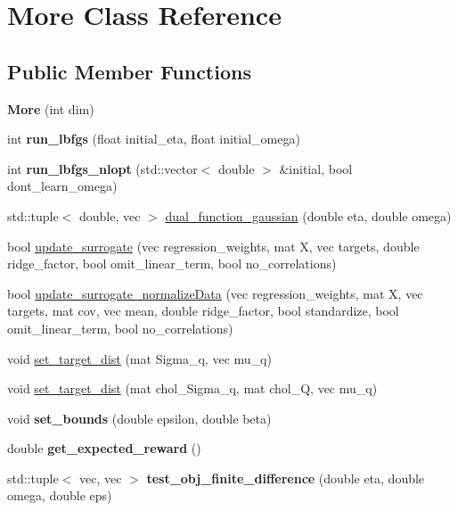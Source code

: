 \hypertarget{classMore}{}\section{More Class Reference}
\label{classMore}
\subsection*{Public Member Functions}
\begin{DoxyCompactItemize}
\item 
{\bfseries More} (int dim)\hypertarget{classMore_a4d5e29a878e515129484d2a04738ed4f}{}\label{classMore_a4d5e29a878e515129484d2a04738ed4f}

\item 
int {\bfseries run\+\_\+lbfgs} (float initial\+\_\+eta, float initial\+\_\+omega)\hypertarget{classMore_a1deae43fa72d7ce2ef34dd10cc44a75f}{}\label{classMore_a1deae43fa72d7ce2ef34dd10cc44a75f}

\item 
int {\bfseries run\+\_\+lbfgs\+\_\+nlopt} (std\+::vector$<$ double $>$ \&initial, bool dont\+\_\+learn\+\_\+omega)\hypertarget{classMore_aafcaa1a9dd299715349391a9092691ad}{}\label{classMore_aafcaa1a9dd299715349391a9092691ad}

\item 
std\+::tuple$<$ double, vec $>$ \hyperlink{classMore_aa3fdb202ca291e253f7c157d8a13040b}{dual\+\_\+function\+\_\+gaussian} (double eta, double omega)
\item 
bool \hyperlink{classMore_a5bb1da06e25a581a06d4c84359702e7b}{update\+\_\+surrogate} (vec regression\+\_\+weights, mat X, vec targets, double ridge\+\_\+factor, bool omit\+\_\+linear\+\_\+term, bool no\+\_\+correlations)
\item 
bool \hyperlink{classMore_a0943909cf34c607dba952bf65f724702}{update\+\_\+surrogate\+\_\+normalize\+Data} (vec regression\+\_\+weights, mat X, vec targets, mat cov, vec mean, double ridge\+\_\+factor, bool standardize, bool omit\+\_\+linear\+\_\+term, bool no\+\_\+correlations)
\item 
void \hyperlink{classMore_a7163e4cb11467ccbdb76b830a193c597}{set\+\_\+target\+\_\+dist} (mat Sigma\+\_\+q, vec mu\+\_\+q)
\item 
void \hyperlink{classMore_a52a17e3a77606659aeb668ad597aac62}{set\+\_\+target\+\_\+dist} (mat chol\+\_\+\+Sigma\+\_\+q, mat chol\+\_\+Q, vec mu\+\_\+q)
\item 
void {\bfseries set\+\_\+bounds} (double epsilon, double beta)\hypertarget{classMore_a67b66cbfcc08b37d6781f7887fccbfbf}{}\label{classMore_a67b66cbfcc08b37d6781f7887fccbfbf}

\item 
double {\bfseries get\+\_\+expected\+\_\+reward} ()\hypertarget{classMore_a37becd406f53d7d4ea39a63ecddaff65}{}\label{classMore_a37becd406f53d7d4ea39a63ecddaff65}

\item 
std\+::tuple$<$ vec, vec $>$ {\bfseries test\+\_\+obj\+\_\+finite\+\_\+difference} (double eta, double omega, double eps)\hypertarget{classMore_a46f6dafc240f9c318734ed7ffbee73b7}{}\label{classMore_a46f6dafc240f9c318734ed7ffbee73b7}

\end{DoxyCompactItemize}
